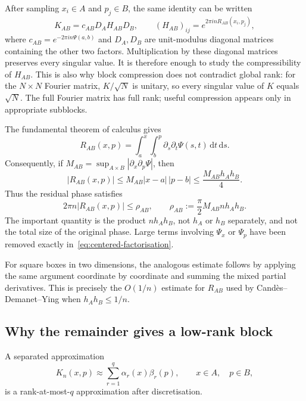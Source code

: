 \documentclass[11pt,a4paper]{article}
\numberwithin{equation}{section}
\begin{document}
After sampling $x_i\in A$ and $p_j\in B$, the same identity can be written
\begin{equation}
    K_{AB}=c_{AB}D_AH_{AB}D_B,
    \qquad (H_{AB})_{ij}=e^{2\pi i nR_{AB}(x_i,p_j)},
\end{equation}
where $c_{AB}=e^{-2\pi i n\Psi(a,b)}$ and $D_A,D_B$ are unit-modulus diagonal matrices containing the other two factors. Multiplication by these diagonal matrices preserves every singular value. It is therefore enough to study the compressibility of $H_{AB}$. This is also why block compression does not contradict global rank: for the $N\times N$ Fourier matrix, $K/\sqrt{N}$ is unitary, so every singular value of $K$ equals $\sqrt{N}$. The full Fourier matrix has full rank; useful compression appears only in appropriate subblocks.

The fundamental theorem of calculus gives
\begin{equation}
    R_{AB}(x,p)
    =\int_a^x\int_b^p \partial_s\partial_t\Psi(s,t)
      \,\mathrm{d}t\,\mathrm{d}s.
    \label{eq:mixed-integral}
\end{equation}
Consequently, if
$M_{AB}=\sup_{A\times B}|\partial_x\partial_p\Psi|$, then
\begin{equation}
    |R_{AB}(x,p)|
    \leq M_{AB}|x-a|\,|p-b|
    \leq \frac{M_{AB}h_Ah_B}{4}.
    \label{eq:rectangle-bound}
\end{equation}
Thus the residual phase satisfies
\begin{equation}
    2\pi n|R_{AB}(x,p)|
    \leq \rho_{AB},
    \qquad
    \rho_{AB}:=\frac{\pi}{2}M_{AB}n h_Ah_B.
    \label{eq:residual-phase-bound}
\end{equation}
The important quantity is the product $n h_Ah_B$, not $h_A$ or $h_B$ separately, and not the total size of the original phase. Large terms involving $\Psi_x$ or $\Psi_p$ have been removed exactly in~\eqref{eq:centered-factorisation}.

For square boxes in two dimensions, the analogous estimate follows by applying the same argument coordinate by coordinate and summing the mixed partial derivatives. This is precisely the $O(1/n)$ estimate for $R_{AB}$ used by Cand\`{e}s--Demanet--Ying when $h_Ah_B\leq 1/n$.

\subsection{Why the remainder gives a low-rank block}

A separated approximation
\begin{equation}
    K_n(x,p)\approx \sum_{r=1}^{q}\alpha_r(x)\beta_r(p),
    \qquad x\in A,\quad p\in B,
    \label{eq:separated-block}
\end{equation}
is a rank-at-most-$q$ approximation after discretisation.
\end{document}
